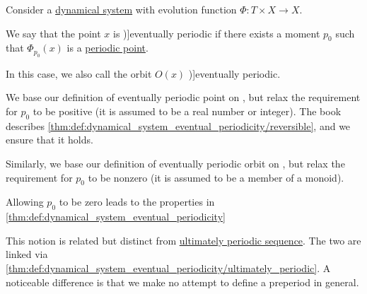 \begin{definition}\label{def:dynamical_system_eventual_periodicity}
  Consider a \hyperref[def:dynamical_system]{dynamical system} with evolution function \( \Phi: T \times X \to X \).

  We say that the point \( x \) is \term[en=eventually periodic (point) (\cite[2]{BrinStuck2002DynamicalSystems})]{eventually periodic} if there exists a moment \( p_0 \) such that \( \Phi_{p_0}(x) \) is a \hyperref[def:dynamical_system_periodicity]{periodic point}.

  In this case, we also call the orbit \( O(x) \) \term[en=eventually periodic (orbit) (\cite[def. 12(ii)]{GiuntiMazzola2012DynamicalSystemsOnMonoids})]{eventually periodic}.
\end{definition}
\begin{comments}
  \item We base our definition of eventually periodic point on \cite[2]{BrinStuck2002DynamicalSystems}, but relax the requirement for \( p_0 \) to be positive (it is assumed to be a real number or integer). The book describes \cref{thm:def:dynamical_system_eventual_periodicity/reversible}, and we ensure that it holds.

  Similarly, we base our definition of eventually periodic orbit on \cite[def. 12(ii)]{GiuntiMazzola2012DynamicalSystemsOnMonoids}, but relax the requirement for \( p_0 \) to be nonzero (it is assumed to be a member of a monoid).

  Allowing \( p_0 \) to be zero leads to the properties in \cref{thm:def:dynamical_system_eventual_periodicity}

  \item This notion is related but distinct from \hyperref[def:ultimately_periodic_sequence]{ultimately periodic sequence}. The two are linked via \cref{thm:def:dynamical_system_eventual_periodicity/ultimately_periodic}. A noticeable difference is that we make no attempt to define a preperiod in general.
\end{comments}

